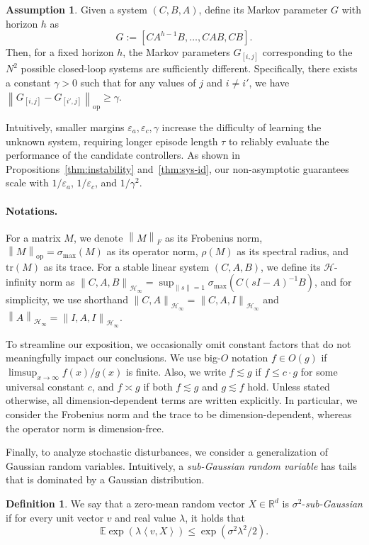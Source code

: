 \documentclass[11pt, twoside]{article}
\theoremstyle{definition}
\newtheorem{assumption}{Assumption}
\newtheorem{definition}{Definition}
\newcommand{\RR}{\mathbb{R}}
\newcommand{\EE}{\mathbb{E}}
\newcommand{\norm}[1]{\left\lVert #1 \right\rVert}
\newcommand{\inner}[2]{\left\langle #1, #2 \right\rangle}
\newcommand{\tr}{\mathrm{tr}}
\newcommand{\opnorm}[1]{\norm{#1}_{\mathrm{op}}}
\newcommand{\hinfnorm}[1]{\norm{#1}_{\mathcal{H}_\infty}}
\begin{document}
\begin{assumption}
\label{assum:markov-sep}
    Given a system $(C, B, A)$, define its Markov parameter $G$ with horizon $h$ as
    \[G := \left[C A^{h-1} B, \dots, C A B, C B\right].\]
    Then, for a fixed horizon $h$, the Markov parameters $G_{[i,j]}$ corresponding to the $N^2$ possible closed-loop systems are sufficiently different.
    Specifically, there exists a constant $\gamma > 0$ such that for any values of $j$ and $i \neq i'$, we have $\opnorm{G_{[i,j]} - G_{[i',j]}} \ge \gamma$.
\end{assumption}

Intuitively, smaller margins $\varepsilon_a, \varepsilon_c, \gamma$ increase the difficulty of learning the unknown system, requiring longer episode length $\tau$ to reliably evaluate the performance of the candidate controllers.
As shown in Propositions~\ref{thm:instability} and~\ref{thm:sys-id}, our non-asymptotic guarantees scale with $1/\varepsilon_a$, $1/\varepsilon_c$, and $1/\gamma^2$.

\paragraph{Notations.}
For a matrix $M$, we denote $\norm{M}_F$ as its Frobenius norm, $\opnorm{M} = \sigma_{\max}(M)$ as its operator norm, $\rho(M)$ as its spectral radius, and $\tr(M)$ as its trace.
For a stable linear system $(C, A, B)$, we define its $\mathcal{H}$-infinity norm as $\hinfnorm{C, A, B} = \sup_{\norm{s}=1} \sigma_{\max}(C(s I - A)^{-1}B)$, and for simplicity, we use shorthand $\hinfnorm{C, A} = \hinfnorm{C, A, I}$ and $\hinfnorm{A} = \hinfnorm{I, A, I}$.


To streamline our exposition, we occasionally omit constant factors that do not meaningfully impact our conclusions.
We use big-$O$ notation $f \in O(g)$ if $\limsup_{x \to \infty} f(x) / g(x)$ is finite.
Also, we write $f \lesssim g$ if $f \le c \cdot g$ for some universal constant $c$, and $f \asymp g$ if both $f \lesssim g$ and $g \lesssim f$ hold.
Unless stated otherwise, all dimension-dependent terms are written explicitly.
In particular, we consider the Frobenius norm and the trace to be dimension-dependent, whereas the operator norm is dimension-free.

Finally, to analyze stochastic disturbances, we consider a generalization of Gaussian random variables.
Intuitively, a \textit{sub-Gaussian random variable} has tails that is dominated by a Gaussian distribution.
\begin{definition}
    We say that a zero-mean random vector $X \in \RR^d$ is $\sigma^2$-\textit{sub-Gaussian} if for every unit vector $v$ and real value $\lambda$, it holds that
    \[ \EE \exp(\lambda \inner{v}{X}) \le \exp(\sigma^2\lambda^2 / 2).\]
\end{definition} 
\end{document}
